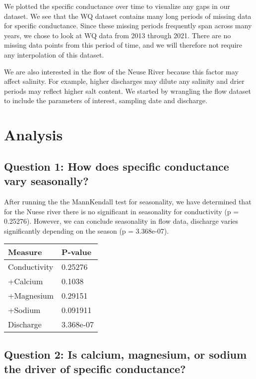 \documentclass[
  12pt,
]{article}
\begin{document}
We plotted the specific conductance over time to visualize any gaps in
our dataset. We see that the WQ dataset contains many long periods of
missing data for specific conductance. Since these missing periods
frequently span across many years, we chose to look at WQ data from 2013
through 2021. There are no missing data points from this period of time,
and we will therefore not require any interpolation of this dataset.

We are also interested in the flow of the Neuse River because this
factor may affect salinity. For example, higher discharges may dilute
any salinity and drier periods may reflect higher salt content. We
started by wrangling the flow dataset to include the parameters of
interest, sampling date and discharge.

\newpage

\hypertarget{analysis}{%
\section{Analysis}\label{analysis}}

\hypertarget{question-1-how-does-specific-conductance-vary-seasonally}{%
\subsection{Question 1: How does specific conductance vary
seasonally?}\label{question-1-how-does-specific-conductance-vary-seasonally}}

After running the the MannKendall test for seasonality, we have
determined that for the Nuese river there is no significant in
seasonality for conductivity (p = 0.25276). However, we can conclude
seasonality in flow data, discharge varies significantly depending on
the season (p = 3.368e-07).

\begin{longtable}[]{@{}ll@{}}
\toprule
Measure & P-value \\
\midrule
\endhead
Conductivity & 0.25276 \\
+Calcium & 0.1038 \\
+Magnesium & 0.29151 \\
+Sodium & 0.091911 \\
Discharge & 3.368e-07 \\
\bottomrule
\end{longtable}

\hypertarget{question-2-is-calcium-magnesium-or-sodium-the-driver-of-specific-conductance}{%
\subsection{Question 2: Is calcium, magnesium, or sodium the driver of
specific
conductance?}\label{question-2-is-calcium-magnesium-or-sodium-the-driver-of-specific-conductance}}
\end{document}
